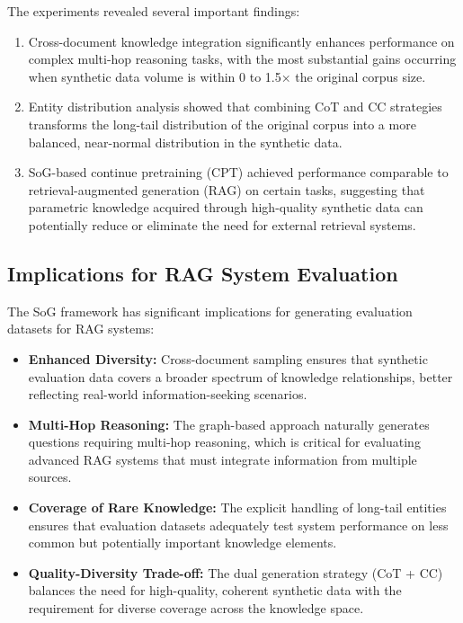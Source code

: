 \documentclass[11pt,a4paper]{article}
\begin{document}
The experiments revealed several important findings:

\begin{enumerate}
    \item Cross-document knowledge integration significantly enhances performance on complex multi-hop reasoning tasks, with the most substantial gains occurring when synthetic data volume is within 0 to 1.5× the original corpus size.
    
    \item Entity distribution analysis showed that combining CoT and CC strategies transforms the long-tail distribution of the original corpus into a more balanced, near-normal distribution in the synthetic data.
    
    \item SoG-based continue pretraining (CPT) achieved performance comparable to retrieval-augmented generation (RAG) on certain tasks, suggesting that parametric knowledge acquired through high-quality synthetic data can potentially reduce or eliminate the need for external retrieval systems.
\end{enumerate}

\subsection{Implications for RAG System Evaluation}

The SoG framework has significant implications for generating evaluation datasets for RAG systems:

\begin{itemize}
    \item \textbf{Enhanced Diversity:} Cross-document sampling ensures that synthetic evaluation data covers a broader spectrum of knowledge relationships, better reflecting real-world information-seeking scenarios.
    
    \item \textbf{Multi-Hop Reasoning:} The graph-based approach naturally generates questions requiring multi-hop reasoning, which is critical for evaluating advanced RAG systems that must integrate information from multiple sources.
    
    \item \textbf{Coverage of Rare Knowledge:} The explicit handling of long-tail entities ensures that evaluation datasets adequately test system performance on less common but potentially important knowledge elements.
    
    \item \textbf{Quality-Diversity Trade-off:} The dual generation strategy (CoT + CC) balances the need for high-quality, coherent synthetic data with the requirement for diverse coverage across the knowledge space.
\end{itemize}
\end{document}

